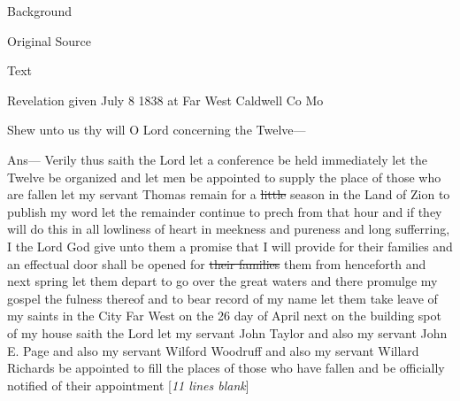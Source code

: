 				\begin{description}
					\item[Background]
				\end{description}
				
				
				\begin{description}
					\item[Original Source]
				\end{description}
				
				
				\begin{description}
					\item[Text]
				\end{description}
				
					Revelation given July 8 1838 at Far West Caldwell Co Mo
					
					Shew unto us thy will O Lord concerning the Twelve---
					
					Ans--- Verily thus saith the Lord let a conference be held immediately let the Twelve be organized and let men be appointed to supply the place of those who are fallen let my servant Thomas remain for a \sout{little} season in the Land of Zion to publish my word let the remainder continue to prech from that hour and if they will do this in all lowliness of heart in meekness and pureness and long sufferring, I the Lord God give unto them a promise that I will provide for their families and an effectual door shall be opened for \sout{their families} them from henceforth and next spring let them depart to go over the great waters and there promulge my gospel the fulness thereof and to bear record of my name let them take leave of my saints in the City Far West on the 26 day of April next on the building spot of my house saith the Lord let my servant John Taylor and also my servant John E. Page and also my servant Wilford Woodruff and also my servant Willard Richards be appointed to fill the places of those who have fallen and be officially notified of their appointment [\textit{11 lines blank}]
					
